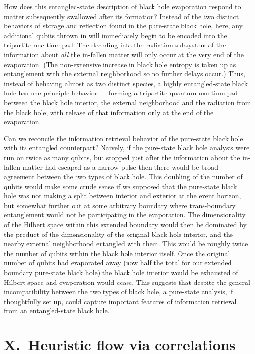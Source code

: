 \documentclass[twocolumn,aps,showpacs,prl]{revtex4}
\begin{document}
How does this entangled-state description of black hole evaporation
respond to matter subsequently swallowed after its formation? Instead
of the two distinct behaviors of storage and reflection found in the
pure-state black hole, here, any additional qubits thrown in will
immediately begin to be encoded into the tripartite one-time pad.
The decoding into the radiation subsystem of the information about
{\it all\/} the in-fallen matter will only occur at the very end of
the evaporation. (The non-extensive increase in black 
hole entropy is taken up as entanglement with the external neighborhood 
so no further delays occur.) Thus, instead of behaving almost
as two distinct species, a highly entangled-state black hole has one
principle behavior --- forming a tripartite quantum one-time pad
between the black hole interior, the external neighborhood
and the radiation from the black hole, with release of that information
only at the end of the evaporation.

Can we reconcile the information retrieval behavior of the pure-state
black hole with its entangled counterpart? Naively, if the pure-state
black hole analysis were run on twice as many qubits, but stopped
just after the information about the in-fallen matter had escaped
as a narrow pulse then there would be broad agreement between the
two types of black hole. This doubling of the number of qubits would make some
crude sense if we supposed that the pure-state black hole was not making
a split between interior and exterior at the event horizon, but
somewhat further out at some arbitrary boundary where trans-boundary
entanglement would not be participating in the evaporation. The
dimensionality of the Hilbert space within this extended boundary
would then be dominated by the product of the dimensionality of the
original black hole interior, and the nearby external neighborhood entangled
with them. This would be roughly twice the number of qubits within the
black hole interior itself. Once the original number of qubits had
evaporated away (now half the total for our extended boundary
pure-state black hole) the black hole interior would be exhausted of
Hilbert space and evaporation would cease. This suggests that
despite the general incompatibility between the two types of black hole, a
pure-state analysis, if thoughtfully set up, could capture important
features of information retrieval from an entangled-state black hole.



\section{X.\ Heuristic flow via correlations}
\label{heuristic}
\end{document}
